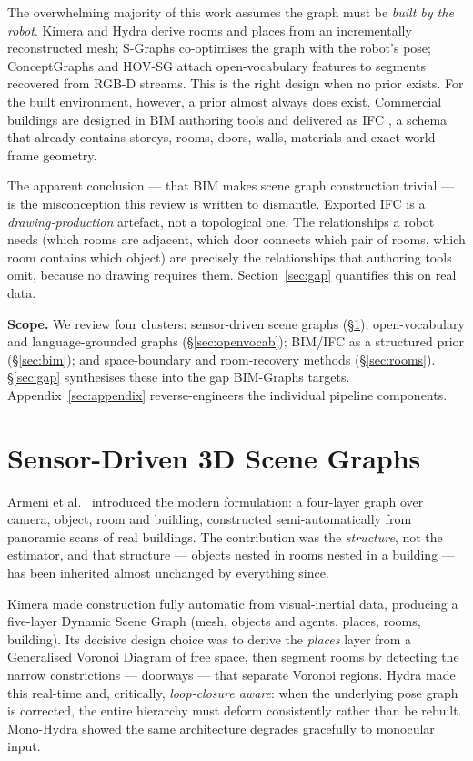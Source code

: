 \documentclass[10pt,twocolumn,letterpaper]{article}
\begin{document}
The overwhelming majority of this work assumes the graph must be \emph{built by
the robot}. Kimera \cite{rosinol2021kimera} and Hydra \cite{hughes2022hydra}
derive rooms and places from an incrementally reconstructed mesh; S-Graphs
\cite{bavle2022sgraphs,bavle2022sgraphsplus} co-optimises the graph with the
robot's pose; ConceptGraphs \cite{gu2023conceptgraphs} and HOV-SG
\cite{werby2024hovsg} attach open-vocabulary features to segments recovered from
RGB-D streams. This is the right design when no prior exists. For the built
environment, however, a prior almost always does exist. Commercial buildings are
designed in BIM authoring tools and delivered as IFC \cite{buildingsmart_ifc4},
a schema that already contains storeys, rooms, doors, walls, materials and
exact world-frame geometry.

The apparent conclusion --- that BIM makes scene graph construction trivial ---
is the misconception this review is written to dismantle. Exported IFC is a
\emph{drawing-production} artefact, not a topological one. The relationships a
robot needs (which rooms are adjacent, which door connects which pair of rooms,
which room contains which object) are precisely the relationships that authoring
tools omit, because no drawing requires them. Section~\ref{sec:gap} quantifies
this on real data.

\medskip\noindent\textbf{Scope.} We review four clusters:
sensor-driven scene graphs (\S\ref{sec:sensor}); open-vocabulary and
language-grounded graphs (\S\ref{sec:openvocab}); BIM/IFC as a structured prior
(\S\ref{sec:bim}); and space-boundary and room-recovery methods
(\S\ref{sec:rooms}). \S\ref{sec:gap} synthesises these into the gap BIM-Graphs
targets. Appendix~\ref{sec:appendix} reverse-engineers the individual pipeline
components.

\section{Sensor-Driven 3D Scene Graphs}
\label{sec:sensor}

Armeni et al.\ \cite{armeni20193d} introduced the modern formulation: a
four-layer graph over camera, object, room and building, constructed
semi-automatically from panoramic scans of real buildings. The contribution was
the \emph{structure}, not the estimator, and that structure --- objects nested in
rooms nested in a building --- has been inherited almost unchanged by everything
since.

Kimera \cite{rosinol2021kimera} made construction fully automatic from
visual-inertial data, producing a five-layer Dynamic Scene Graph (mesh, objects
and agents, places, rooms, building). Its decisive design choice was to derive
the \emph{places} layer from a Generalised Voronoi Diagram of free space, then
segment rooms by detecting the narrow constrictions --- doorways --- that
separate Voronoi regions. Hydra \cite{hughes2022hydra} made this real-time and,
critically, \emph{loop-closure aware}: when the underlying pose graph is
corrected, the entire hierarchy must deform consistently rather than be rebuilt.
Mono-Hydra \cite{udugama2023monohydra} showed the same architecture degrades
gracefully to monocular input.
\end{document}
